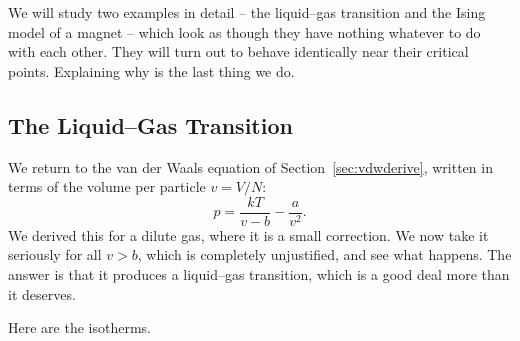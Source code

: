 \documentclass[a4paper]{scrartcl}
\begin{document}
We will study two examples in detail -- the liquid--gas transition and the Ising model of a magnet -- which look as though they have nothing whatever to do with each other. They will turn out to behave identically near their critical points. Explaining why is the last thing we do.

\subsection{The Liquid--Gas Transition}\label{sec:liquidgas}

We return to the van der Waals equation of Section~\ref{sec:vdwderive}, written in terms of the volume per particle $v = V/N$:
$$
p = \frac{kT}{v - b} - \frac{a}{v^2}.
$$
We derived this for a dilute gas, where it is a small correction. We now take it seriously for all $v > b$, which is completely unjustified, and see what happens. The answer is that it produces a liquid--gas transition, which is a good deal more than it deserves.

Here are the isotherms.
\end{document}
